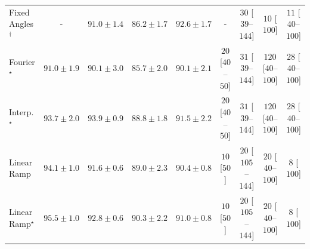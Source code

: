 \begin{tabular}{l|cccc|cccc|}
Fixed Angles$^\dagger$ & {\cellcolor[HTML]{000000}} \color[HTML]{F1F1F1} {\cellcolor{white}} \color{black} - & {\cellcolor[HTML]{076D39}} \color[HTML]{F1F1F1} $91.0\pm 1.4$ & {\cellcolor[HTML]{248644}} \color[HTML]{F1F1F1} $86.2\pm 1.7$ & {\cellcolor[HTML]{006536}} \color[HTML]{F1F1F1} $92.6\pm 1.7$ & {\cellcolor[HTML]{000000}} \color[HTML]{F1F1F1} {\cellcolor{white}} \color{black} - & {\cellcolor[HTML]{FFF2EE}} \color[HTML]{000000} $30$ [$39$--$144$] & {\cellcolor[HTML]{FFF7F3}} \color[HTML]{000000} $10$ [$100$] & {\cellcolor[HTML]{FFF6F2}} \color[HTML]{000000} $11$ [$40$--$100$] \\
Fourier$^\star$ & {\cellcolor[HTML]{076D39}} \color[HTML]{F1F1F1} $91.0\pm 1.9$ & {\cellcolor[HTML]{0C723B}} \color[HTML]{F1F1F1} $90.1\pm 3.0$ & {\cellcolor[HTML]{278946}} \color[HTML]{F1F1F1} $85.7\pm 2.0$ & {\cellcolor[HTML]{0C723B}} \color[HTML]{F1F1F1} $90.1\pm 2.1$ & {\cellcolor[HTML]{FFF4F0}} \color[HTML]{000000} $20$ [$40$--$50$] & {\cellcolor[HTML]{FFF2EE}} \color[HTML]{000000} $31$ [$39$--$144$] & {\cellcolor[HTML]{FDDCD8}} \color[HTML]{000000} $120$ [$40$--$100$] & {\cellcolor[HTML]{FFF3EF}} \color[HTML]{000000} $28$ [$40$--$100$] \\
Interp.$^\star$ & {\cellcolor[HTML]{005E33}} \color[HTML]{F1F1F1} $93.7\pm 2.0$ & {\cellcolor[HTML]{005D33}} \color[HTML]{F1F1F1} $93.9\pm 0.9$ & {\cellcolor[HTML]{15793E}} \color[HTML]{F1F1F1} $88.8\pm 1.8$ & {\cellcolor[HTML]{056C39}} \color[HTML]{F1F1F1} $91.5\pm 2.2$ & {\cellcolor[HTML]{FFF4F0}} \color[HTML]{000000} $20$ [$40$--$50$] & {\cellcolor[HTML]{FFF2EE}} \color[HTML]{000000} $31$ [$39$--$144$] & {\cellcolor[HTML]{FDDCD8}} \color[HTML]{000000} $120$ [$40$--$100$] & {\cellcolor[HTML]{FFF3EF}} \color[HTML]{000000} $28$ [$40$--$100$] \\
Linear Ramp & {\cellcolor[HTML]{005C32}} \color[HTML]{F1F1F1} $94.1\pm 1.0$ & {\cellcolor[HTML]{036B38}} \color[HTML]{F1F1F1} $91.6\pm 0.6$ & {\cellcolor[HTML]{13773D}} \color[HTML]{F1F1F1} $89.0\pm 2.3$ & {\cellcolor[HTML]{0B713B}} \color[HTML]{F1F1F1} $90.4\pm 0.8$ & {\cellcolor[HTML]{FFF7F3}} \color[HTML]{000000} $10$ [$50$] & {\cellcolor[HTML]{FFF4F0}} \color[HTML]{000000} $20$ [$105$--$144$] & {\cellcolor[HTML]{FFF4F0}} \color[HTML]{000000} $20$ [$40$--$100$] & {\cellcolor[HTML]{FFF7F3}} \color[HTML]{000000} $8$ [$100$] \\
Linear Ramp$^\star$ & {\cellcolor[HTML]{00532F}} \color[HTML]{F1F1F1} $95.5\pm 1.0$ & {\cellcolor[HTML]{006435}} \color[HTML]{F1F1F1} $92.8\pm 0.6$ & {\cellcolor[HTML]{0B713B}} \color[HTML]{F1F1F1} $90.3\pm 2.2$ & {\cellcolor[HTML]{076D39}} \color[HTML]{F1F1F1} $91.0\pm 0.8$ & {\cellcolor[HTML]{FFF7F3}} \color[HTML]{000000} $10$ [$50$] & {\cellcolor[HTML]{FFF4F0}} \color[HTML]{000000} $20$ [$105$--$144$] & {\cellcolor[HTML]{FFF4F0}} \color[HTML]{000000} $20$ [$40$--$100$] & {\cellcolor[HTML]{FFF7F3}} \color[HTML]{000000} $8$ [$100$] \\

\end{tabular}
